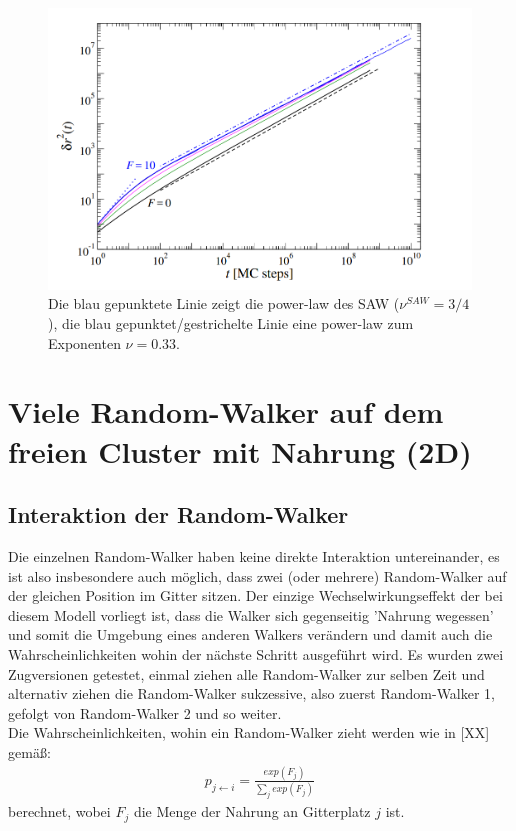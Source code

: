 \documentclass[a4paper, 12pt]{report}
\begin{document}
\begin{figure}[h!]
	\centering
	\includegraphics[scale=0.5]{food_thomas.png}
	\caption{Die blau gepunktete Linie zeigt die power-law des SAW ($\nu^{SAW}=3/4$), die blau gepunktet/gestrichelte Linie eine power-law zum Exponenten $\nu = 0.33$.}
\end{figure}

\chapter{Viele Random-Walker auf dem freien Cluster mit Nahrung (2D)}
\section{Interaktion der Random-Walker}
Die einzelnen Random-Walker haben keine direkte Interaktion untereinander, es ist also insbesondere auch möglich, dass zwei (oder mehrere) Random-Walker auf der gleichen Position im Gitter sitzen. Der einzige Wechselwirkungseffekt der bei diesem Modell vorliegt ist, dass die Walker sich gegenseitig 'Nahrung wegessen' und somit die Umgebung eines anderen Walkers verändern und damit auch die Wahrscheinlichkeiten wohin der nächste Schritt ausgeführt wird. Es wurden zwei Zugversionen getestet, einmal ziehen alle Random-Walker zur selben Zeit und alternativ ziehen die Random-Walker sukzessive, also zuerst Random-Walker 1, gefolgt von Random-Walker 2 und so weiter. \\
\noindent Die Wahrscheinlichkeiten, wohin ein Random-Walker zieht werden wie in [XX] gemäß:
\begin{align}
p_{j \leftarrow i} = \frac{exp({F_j})}{\sum_j exp({F_j})}
\label{Wkeiten}
\end{align}
berechnet, wobei $F_j$ die Menge der Nahrung an Gitterplatz $j$ ist.
\end{document}

